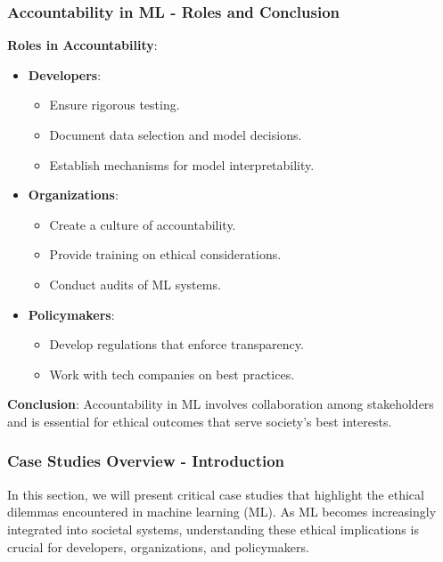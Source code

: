 \documentclass[aspectratio=169]{beamer}
\begin{document}
\begin{frame}[fragile]
    \frametitle{Accountability in ML - Roles and Conclusion}
    \textbf{Roles in Accountability}:
    \begin{itemize}
        \item \textbf{Developers}:
            \begin{itemize}
                \item Ensure rigorous testing.
                \item Document data selection and model decisions.
                \item Establish mechanisms for model interpretability.
            \end{itemize}
        \item \textbf{Organizations}:
            \begin{itemize}
                \item Create a culture of accountability.
                \item Provide training on ethical considerations.
                \item Conduct audits of ML systems.
            \end{itemize}
        \item \textbf{Policymakers}:
            \begin{itemize}
                \item Develop regulations that enforce transparency.
                \item Work with tech companies on best practices.
            \end{itemize}
    \end{itemize}

    \textbf{Conclusion}:
    Accountability in ML involves collaboration among stakeholders and is essential for ethical outcomes that serve society's best interests.
\end{frame}

\begin{frame}[fragile]
    \frametitle{Case Studies Overview - Introduction}
    In this section, we will present critical case studies that highlight the ethical dilemmas encountered in machine learning (ML). As ML becomes increasingly integrated into societal systems, understanding these ethical implications is crucial for developers, organizations, and policymakers.
\end{frame}
\end{document}
